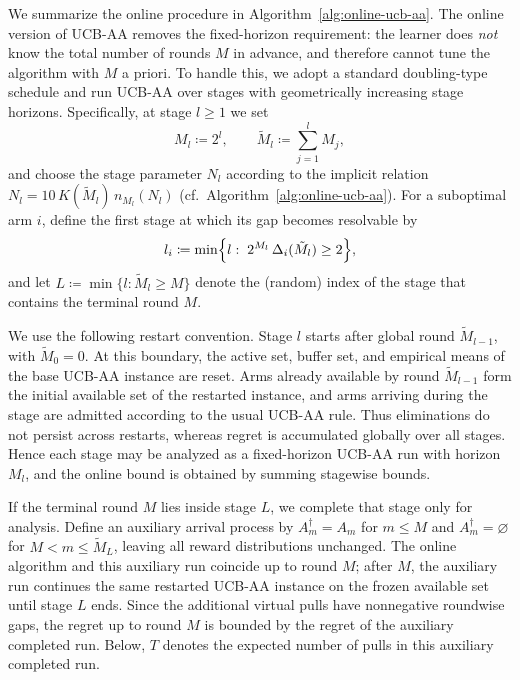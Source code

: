 \documentclass[11pt]{article}
\begin{document}
We summarize the online procedure in Algorithm~\ref{alg:online-ucb-aa}. The online version of UCB-AA removes the fixed-horizon requirement: the learner does \emph{not} know the total number of rounds $M$ in advance, and therefore cannot tune the algorithm with $M$ a priori. To handle this, we adopt a standard doubling-type schedule and run UCB-AA over stages with geometrically increasing stage horizons. Specifically, at stage $l\ge 1$ we set
\[
M_l \coloneqq 2^l,
\qquad
\tilde{M}_l \coloneqq \sum_{j=1}^l M_j,
\]
and choose the stage parameter $N_l$ according to the implicit relation $N_l=10\,K(\tilde{M}_l)\,n_{M_l}(N_l)$ (cf.\ Algorithm~\ref{alg:online-ucb-aa}). For a suboptimal arm $i$, define the first stage at which its gap becomes resolvable by
\[
l_i \coloneqq \min\Bigl\{l:\; 2^{M_l}\,\Delta_i(\tilde{M}_l)\ge 2\Bigr\},
\]
and let $L \coloneqq \min\{l:\tilde{M}_l\ge M\}$ denote the (random) index of the stage that contains the terminal round $M$.

We use the following restart convention. Stage \(l\) starts after global round
\(\tilde M_{l-1}\), with \(\tilde M_0=0\). At this boundary, the active set,
buffer set, and empirical means of the base UCB-AA instance are reset. Arms
already available by round \(\tilde M_{l-1}\) form the initial available set of
the restarted instance, and arms arriving during the stage are admitted according
to the usual UCB-AA rule. Thus eliminations do not persist across restarts,
whereas regret is accumulated globally over all stages. Hence each stage may be
analyzed as a fixed-horizon UCB-AA run with horizon \(M_l\), and the online
bound is obtained by summing stagewise bounds.

If the terminal round \(M\) lies inside stage \(L\), we complete that stage only
for analysis. Define an auxiliary arrival process by
\(A_m^\dagger=A_m\) for \(m\le M\) and
\(A_m^\dagger=\varnothing\) for \(M<m\le \tilde M_L\), leaving all reward
distributions unchanged. The online algorithm and this auxiliary run coincide
up to round \(M\); after \(M\), the auxiliary run continues the same restarted
UCB-AA instance on the frozen available set until stage \(L\) ends. Since the
additional virtual pulls have nonnegative roundwise gaps, the regret up to
round \(M\) is bounded by the regret of the auxiliary completed run. Below,
\(T\) denotes the expected number of pulls in this auxiliary completed run.
\end{document}
